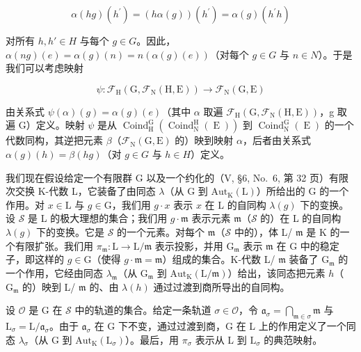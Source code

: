 \[
\alpha (h g) (h ^ {\prime}) = (h \alpha (g)) (h ^ {\prime}) = \alpha (g) (h ^ {\prime} h)\tag{17}
\]

对所有 \(h, h' \in H\) 与每个 \(g \in G\)。因此，\(\alpha(ng)(e) = \alpha(g)(n) = n(\alpha(g)(e))\)（对每个 \(g \in G\) 与 \(n \in N\)）。于是我们可以考虑映射

\[
\psi : \mathcal {F} _ {\mathrm{H}} (\mathrm{G}, \mathcal {F} _ {\mathrm{N}} (\mathrm{H}, \mathrm{E})) \to \mathcal {F} _ {\mathrm{N}} (\mathrm{G}, \mathrm{E})
\]

由关系式 \(\psi(\alpha)(g)=\alpha(g)(e)\)（其中 \(\alpha\) 取遍 \(\mathcal{F}_{\mathrm{H}}(\mathrm{G},\mathcal{F}_{\mathrm{N}}(\mathrm{H},\mathrm{E}))\)，g 取遍 G）定义。映射 \(\psi\) 是从 \(\operatorname{Coind}_{\mathrm{H}}^{\mathrm{G}}(\operatorname{Coind}_{\mathrm{N}}^{\mathrm{H}}(\operatorname{E}))\) 到 \(\operatorname{Coind}_{\mathrm{N}}^{\mathrm{G}}(\operatorname{E})\) 的一个代数同构，其逆把元素 \(\beta\)（\(\mathcal{F}_{\mathrm{N}}(\mathrm{G},\mathrm{E})\) 的）映到映射 \(\alpha\)，后者由关系式 \(\alpha(g)(h)=\beta(hg)\)（对 \(g\in G\) 与 \(h\in H\)）定义。

我们现在假设给定一个有限群 G 以及一个约化的（V, §6, No.~6, 第 32 页）有限次交换 K-代数 L，它装备了由同态 \(\lambda\)（从 G 到 \(\mathrm{Aut}_{\mathrm{K}}(\mathrm{L})\)）所给出的 G 的一个作用。对 \(x \in \mathrm{L}\) 与 \(g \in \mathrm{G}\)，我们用 \(g \cdot x\) 表示 \(x\) 在 L 的自同构 \(\lambda(g)\) 下的变换。设 \(\mathcal{S}\) 是 L 的极大理想的集合；我们用 \(g \cdot \mathfrak{m}\) 表示元素 \(\mathfrak{m}\)（\(\mathcal{S}\) 的）在 L 的自同构 \(\lambda(g)\) 下的变换。它是 \(\mathcal{S}\) 的一个元素。对每个 \(\mathfrak{m}\)（\(\mathcal{S}\) 中的），体 L/ \(\mathfrak{m}\) 是 K 的一个有限扩张。我们用 \(\pi_{\mathfrak{m}}: \mathrm{L} \to \mathrm{L}/\mathfrak{m}\) 表示投影，并用 \(\mathrm{G}_{\mathfrak{m}}\) 表示 \(\mathfrak{m}\) 在 G 中的稳定子，即这样的 \(g \in \mathrm{G}\)（使得 \(g \cdot \mathfrak{m} = \mathfrak{m}\)）组成的集合。K-代数 L/ \(\mathfrak{m}\) 装备了 \(\mathrm{G}_{\mathfrak{m}}\) 的一个作用，它经由同态 \(\lambda_{\mathfrak{m}}\)（从 \(\mathrm{G}_{\mathfrak{m}}\) 到 \(\mathrm{Aut}_{\mathrm{K}}(\mathrm{L}/\mathfrak{m})\)）给出，该同态把元素 \(h\)（\(\mathrm{G}_{\mathfrak{m}}\) 的）映到 L/ \(\mathfrak{m}\) 的、由 \(\lambda(h)\) 通过过渡到商所导出的自同构。

设 \(\mathcal{O}\) 是 G 在 \(\mathcal{S}\) 中的轨道的集合。给定一条轨道 \(\sigma \in \mathcal{O}\)，令 \(\mathfrak{a}_{\sigma} = \bigcap_{\mathfrak{m} \in \sigma} \mathfrak{m}\) 与 \(\mathrm{L}_{\sigma} = \mathrm{L} / \mathfrak{a}_{\sigma}\)。由于 \(\mathfrak{a}_{\sigma}\) 在 G 下不变，通过过渡到商，G 在 L 上的作用定义了一个同态 \(\lambda_{\sigma}\)（从 G 到 \(\mathrm{Aut}_{\mathrm{K}}(\mathrm{L}_{\sigma})\)）。最后，用 \(\pi_{\sigma}\) 表示从 L 到 \(\mathrm{L}_{\sigma}\) 的典范映射。

